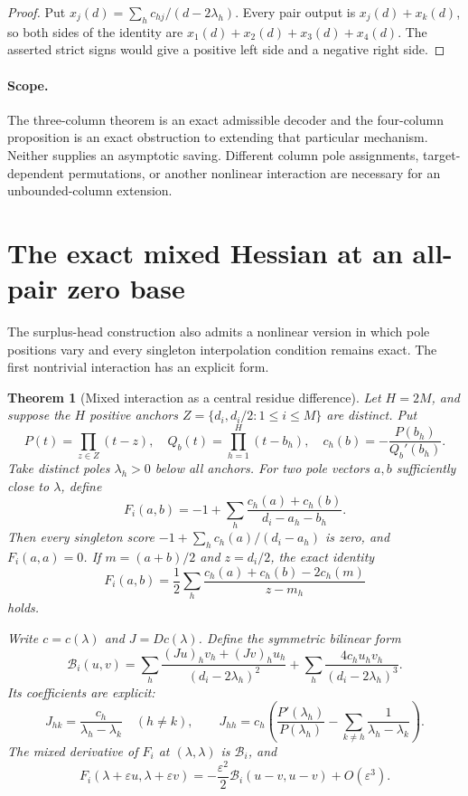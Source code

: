 \documentclass[11pt]{article}
\newtheorem{theorem}{Theorem}
\begin{document}
\begin{proof}
Put $x_j(d)=\sum_h c_{hj}/(d-2\lambda_h)$. Every pair output is
$x_j(d)+x_k(d)$, so both sides of the identity are
$x_1(d)+x_2(d)+x_3(d)+x_4(d)$. The asserted strict signs would give
a positive left side and a negative right side.
\end{proof}

\paragraph{Scope.}
The three-column theorem is an exact admissible decoder and the
four-column proposition is an exact obstruction to extending that
particular mechanism. Neither supplies an asymptotic saving. Different
column pole assignments, target-dependent permutations, or another
nonlinear interaction are necessary for an unbounded-column extension.


\section{The exact mixed Hessian at an all-pair zero base}

The surplus-head construction also admits a nonlinear version in which
pole positions vary and every singleton interpolation condition remains
exact. The first nontrivial interaction has an explicit form.

\begin{theorem}[Mixed interaction as a central residue difference]
Let $H=2M$, and suppose the $H$ positive anchors
$Z=\{d_i,d_i/2:1\le i\le M\}$ are distinct. Put
\[
 P(t)=\prod_{z\in Z}(t-z),\quad Q_b(t)=\prod_{h=1}^H(t-b_h),\quad
 c_h(b)=-\frac{P(b_h)}{Q_b'(b_h)}.
\]
Take distinct poles $\lambda_h>0$ below all anchors. For two pole vectors
$a,b$ sufficiently close to $\lambda$, define
\[
 F_i(a,b)=-1+\sum_h\frac{c_h(a)+c_h(b)}{d_i-a_h-b_h}.
\]
Then every singleton score $-1+\sum_hc_h(a)/(d_i-a_h)$ is zero,
and $F_i(a,a)=0$. If $m=(a+b)/2$ and $z=d_i/2$, the exact identity
\[
 F_i(a,b)=\frac12\sum_h
 \frac{c_h(a)+c_h(b)-2c_h(m)}{z-m_h}
\]
holds.

Write $c=c(\lambda)$ and $J=Dc(\lambda)$. Define the symmetric
bilinear form
\[
 \mathcal B_i(u,v)=\sum_h
 \frac{(Ju)_h v_h+(Jv)_h u_h}{(d_i-2\lambda_h)^2}
 +\sum_h\frac{4c_hu_hv_h}{(d_i-2\lambda_h)^3}.
\]
Its coefficients are explicit:
\[
 J_{hk}=\frac{c_h}{\lambda_h-\lambda_k}\quad(h\ne k),\qquad
 J_{hh}=c_h\left(\frac{P'(\lambda_h)}{P(\lambda_h)}
              -\sum_{k\ne h}\frac1{\lambda_h-\lambda_k}\right).
\]
The mixed derivative of $F_i$ at $(\lambda,\lambda)$ is
$\mathcal B_i$, and
\[
 F_i(\lambda+\varepsilon u,\lambda+\varepsilon v)
 =-\frac{\varepsilon^2}{2}\mathcal B_i(u-v,u-v)
   +O(\varepsilon^3).
\]
\end{theorem}
\end{document}
